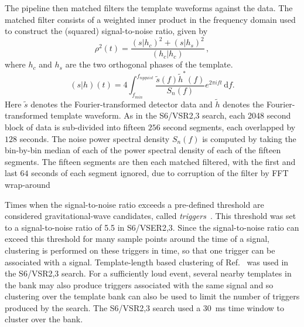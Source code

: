 The pipeline then matched filters the template waveforms against the data.
The matched filter consists of a weighted inner product in the frequency
domain used to construct the (squared) signal-to-noise ratio, given by
%
\begin{equation}
\rho^2(t) = \frac{(s|h_c)^2 + (s|h_s)^2}{(h_c|h_c)} \, ,
\label{eq:snr}
\end{equation}
%
where $h_c$ and $h_s$ are the two orthogonal phases of the template.
%
\begin{equation}
(s|h)(t) = 4\int_{f_{min}}^{f_{nyquist}} \frac{\tilde{s}(f)\tilde{h}^*(f)}{S_n (f)}e^{2\pi i f t}\, \mathrm{d}f.
\label{eq:ip}
\end{equation}
%
Here $\tilde{s}$ denotes the Fourier-transformed detector data and $\tilde{h}$
denotes the Fourier-transformed template waveform. As in the S6/VSR2,3 search,
each 2048 second block of data is sub-divided into fifteen $256$ second
segments, each overlapped by $128$ seconds. The noise power spectral
density $S_n(f)$ is computed by taking the bin-by-bin median of each of the power
spectral density of each of the fifteen segments. The fifteen segments are then each
matched filtered, with the first and last $64$ seconds of each segment
ignored, due to corruption of the filter by FFT
wrap-around~\cite{Allen:2005fk}

Times when the signal-to-noise ratio exceeds a pre-defined threshold are
considered gravitational-wave candidates, called
\emph{triggers}~\cite{Allen:2005fk}. This threshold was set to a
signal-to-noise ratio of 5.5 in S6/VSER2,3.  Since the signal-to-noise ratio can exceed
this threshold for many sample points around the time of a signal, clustering
is performed on these triggers in time, so that one trigger can be associated
with a signal. Template-length based clustering of 
Ref.~\cite{Allen:2005fk} was used in the S6/VSR2,3 search. 
For a sufficiently loud event, several nearby templates in the
bank may also produce triggers associated with the same signal and so
clustering over the template bank can also be used to limit the number of
triggers produced by the search. The S6/VSR2,3 search used a 30~ms time window
to cluster over the bank.

